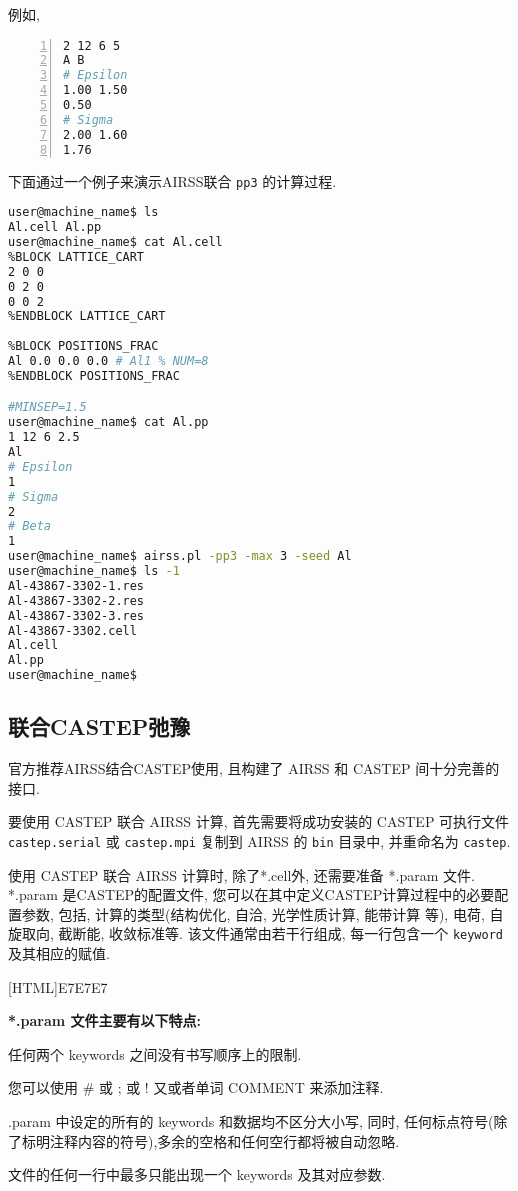 \documentclass[a4paper, 10pt]{article}
\begin{document}
例如,
\begin{lstlisting}[language={bash},numbers=left]
2 12 6 5
A B
# Epsilon
1.00 1.50
0.50
# Sigma
2.00 1.60
1.76
\end{lstlisting}

下面通过一个例子来演示AIRSS联合 \verb|pp3| 的计算过程.
\begin{lstlisting}[language={bash}]
user@machine_name$ ls 
Al.cell Al.pp
user@machine_name$ cat Al.cell
%BLOCK LATTICE_CART
2 0 0
0 2 0
0 0 2 
%ENDBLOCK LATTICE_CART
 
%BLOCK POSITIONS_FRAC
Al 0.0 0.0 0.0 # Al1 % NUM=8
%ENDBLOCK POSITIONS_FRAC

#MINSEP=1.5
user@machine_name$ cat Al.pp
1 12 6 2.5
Al
# Epsilon
1
# Sigma
2
# Beta
1
user@machine_name$ airss.pl -pp3 -max 3 -seed Al
user@machine_name$ ls -1
Al-43867-3302-1.res
Al-43867-3302-2.res
Al-43867-3302-3.res
Al-43867-3302.cell
Al.cell
Al.pp
user@machine_name$
\end{lstlisting}

\subsection{联合CASTEP弛豫}
官方推荐AIRSS结合CASTEP使用, 且构建了 AIRSS 和 CASTEP 间十分完善的接口. 

要使用 CASTEP 联合 AIRSS 计算, 首先需要将成功安装的 CASTEP 可执行文件 \verb|castep.serial| 或 \verb|castep.mpi| 复制到 AIRSS 的 \verb|bin| 目录中, 并重命名为 \verb|castep|.

使用 CASTEP 联合 AIRSS 计算时, 除了*.cell外, 还需要准备 *.param 文件. *.param 是CASTEP的配置文件, 您可以在其中定义CASTEP计算过程中的必要配置参数, 包括, 计算的类型(结构优化, 自洽, 光学性质计算, 能带计算 等), 电荷, 自旋取向, 截断能, 收敛标准等. 该文件通常由若干行组成, 每一行包含一个 \verb|keyword| 及其相应的赋值.

\noindent{}[HTML]{E7E7E7}{\parbox{\textwidth}{%
\noindent \textbf{*.param 文件主要有以下特点:}
\begin{maineu}
\item 任何两个 keywords 之间没有书写顺序上的限制.
\item 您可以使用 \# 或 ; 或 ! 又或者单词 COMMENT 来添加注释.
\item *.param 中设定的所有的 keywords 和数据均不区分大小写, 同时, 任何标点符号(除了标明注释内容的符号),多余的空格和任何空行都将被自动忽略.
\item 文件的任何一行中最多只能出现一个 keywords 及其对应参数.
\end{maineu}}}\\
\end{document}
